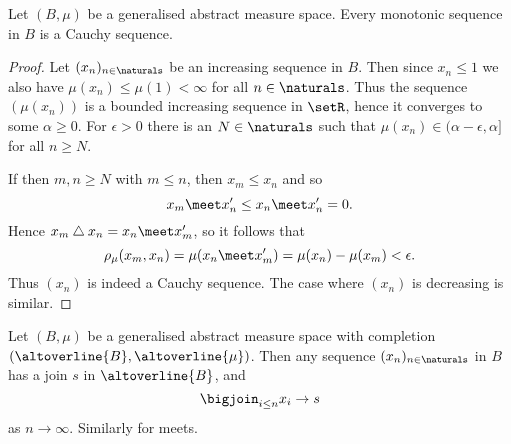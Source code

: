 \documentclass[article, a4paper, 11pt, oneside]{memoir}
\numberwithin{equation}{chapter}
\renewcommand{\symdiff}{\mathbin{\triangle}}
\begin{document}
\begin{lemma}
    \label{thm:monotonic-sequence-Cauchy}
    Let $(B,\mu)$ be a generalised abstract measure space. Every monotonic sequence in $B$ is a Cauchy sequence.
\end{lemma}

\begin{proof}
    Let $(x_n)_{n\in\naturals}$ be an increasing sequence in $B$. Then since $x_n \leq 1$ we also have $\mu(x_n) \leq \mu(1) < \infty$ for all $n \in \naturals$. Thus the sequence $(\mu(x_n))$ is a bounded increasing sequence in $\setR$, hence it converges to some $\alpha \geq 0$. For $\epsilon > 0$ there is an $N \in \naturals$ such that $\mu(x_n) \in (\alpha - \epsilon, \alpha]$ for all $n \geq N$.
    
    If then $m,n \geq N$ with $m \leq n$, then $x_m \leq x_n$ and so
    \begin{equation*}
        x_m \meet x_n'
            \leq x_n \meet x_n'
            = 0.
    \end{equation*}
    Hence $x_m \symdiff x_n = x_n \meet x_m'$, so it follows that
    \begin{equation*}
        \rho_\mu(x_m,x_n)
            = \mu(x_n \meet x_m')
            = \mu(x_n) - \mu(x_m)
            < \epsilon.
    \end{equation*}
    Thus $(x_n)$ is indeed a Cauchy sequence. The case where $(x_n)$ is decreasing is similar.
\end{proof}


\begin{proposition}
    \label{thm:existence-of-joins}
    Let $(B,\mu)$ be a generalised abstract measure space with completion $(\altoverline{B}, \altoverline{\mu})$. Then any sequence $(x_n)_{n\in\naturals}$ in $B$ has a join $s$ in $\altoverline{B}$, and
    \begin{equation*}
        \bigjoin_{i \leq n} x_i
            \to s
    \end{equation*}
    as $n \to \infty$. Similarly for meets.
\end{proposition}
\end{document}
